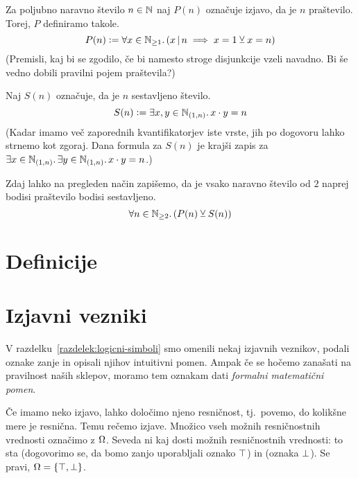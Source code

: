 \begin{zgled}
Za poljubno naravno število $n \in \NN$ naj $P(n)$ označuje izjavo, da je $n$ praštevilo. Torej, $P$ definiramo takole.
\[P(n) \dfeq \all{x \in \NN_{\geq 1}} (x \divides n \implies x = 1 \xor x = n)\]
(Premisli, kaj bi se zgodilo, če bi namesto stroge disjunkcije vzeli navadno. Bi še vedno dobili pravilni pojem praštevila?)

Naj $S(n)$ označuje, da je $n$ sestavljeno število.
\[S(n) \dfeq \some{x, y \in \intoo[\NN]{1}{n}} x \cdot y = n\]
(Kadar imamo več zaporednih kvantifikatorjev iste vrste, jih po dogovoru lahko strnemo kot zgoraj. Dana formula za $S(n)$ je krajši zapis za $\some{x \in \intoo[\NN]{1}{n}} \some{y \in \intoo[\NN]{1}{n}} x \cdot y = n$.)

Zdaj lahko na pregleden način zapišemo, da je vsako naravno število od $2$ naprej bodisi praštevilo bodisi sestavljeno.
\[\all{n \in \NN_{\geq 2}} (P(n) \xor S(n))\]
\end{zgled}

\section{Definicije}








        \section{Izjavni vezniki}

                V razdelku~\ref{razdelek:logicni-simboli} smo omenili nekaj izjavnih veznikov, podali oznake zanje in opisali njihov intuitivni pomen. Ampak če se hočemo zanašati na pravilnost naših sklepov, moramo tem oznakam dati \emph{formalni matematični pomen}.

                Če imamo neko izjavo, lahko določimo njeno resničnost, tj.~povemo, do kolikšne mere je resnična. Temu rečemo  izjave. Množico vseh možnih resničnostnih vrednosti označimo z $\tvs$. Seveda ni kaj dosti možnih resničnostnih vrednosti: to sta  (dogovorimo se, da bomo zanjo uporabljali oznako $\true$) in  (oznaka $\false$). Se pravi, $\tvs = \set{\true, \false}$.

